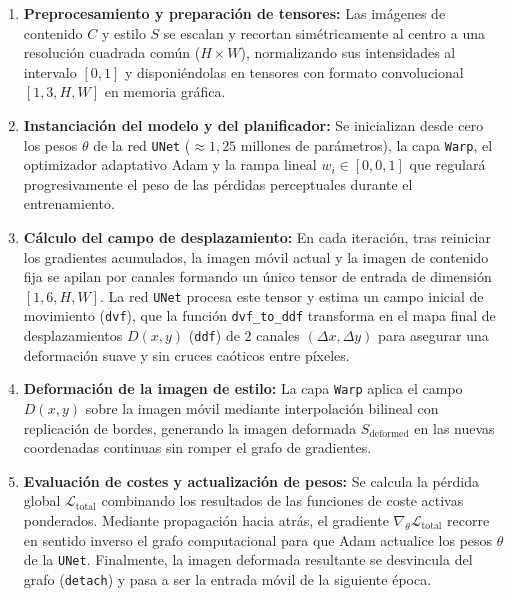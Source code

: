 \documentclass[a4paper]{article}
\begin{document}
\begin{enumerate}
    \item \textbf{Preprocesamiento y preparación de tensores:} Las imágenes de contenido $C$ y estilo $S$ se escalan y recortan simétricamente al centro a una resolución cuadrada común ($H \times W$), normalizando sus intensidades al intervalo $[0, 1]$ y disponiéndolas en tensores con formato convolucional $[1, 3, H, W]$ en memoria gráfica.
    
    \item \textbf{Instanciación del modelo y del planificador:} Se inicializan desde cero los pesos $\theta$ de la red \texttt{UNet} ($\approx 1,25\text{ millones}$ de parámetros), la capa \texttt{Warp}, el optimizador adaptativo Adam \cite{kingma2015adam} y la rampa lineal $w_i \in [0, 0,1]$ que regulará progresivamente el peso de las pérdidas perceptuales durante el entrenamiento.
    
    \item \textbf{Cálculo del campo de desplazamiento:} En cada iteración, tras reiniciar los gradientes acumulados, la imagen móvil actual y la imagen de contenido fija se apilan por canales formando un único tensor de entrada de dimensión $[1, 6, H, W]$. La red \texttt{UNet} procesa este tensor y estima un campo inicial de movimiento (\texttt{dvf}), que la función \texttt{dvf\_to\_ddf} transforma en el mapa final de desplazamientos $D(x, y)$ (\texttt{ddf}) de $2$ canales $(\Delta x, \Delta y)$ para asegurar una deformación suave y sin cruces caóticos entre píxeles.
    
    \item \textbf{Deformación de la imagen de estilo:} La capa \texttt{Warp} aplica el campo $D(x, y)$ sobre la imagen móvil mediante interpolación bilineal con replicación de bordes, generando la imagen deformada $S_{\text{deformed}}$ en las nuevas coordenadas continuas sin romper el grafo de gradientes.
    
    \item \textbf{Evaluación de costes y actualización de pesos:} Se calcula la pérdida global $\mathcal{L}_{\text{total}}$ combinando los resultados de las funciones de coste activas ponderados. Mediante propagación hacia atrás, el gradiente $\nabla_{\theta}\mathcal{L}_{\text{total}}$ recorre en sentido inverso el grafo computacional para que Adam actualice los pesos $\theta$ de la \texttt{UNet}. Finalmente, la imagen deformada resultante se desvincula del grafo (\texttt{detach}) y pasa a ser la entrada móvil de la siguiente época.
\end{enumerate}
\end{document}
